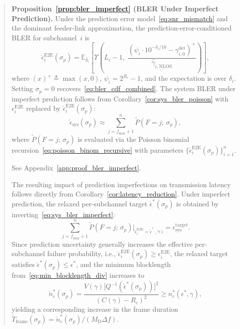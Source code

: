 \begin{quote}
{\noindent\textbf{Proposition~\ref{prop:bler_imperfect} (BLER Under Imperfect Prediction).}
Under the prediction error model~\eqref{eq:snr_mismatch}
and the dominant feeder-link approximation,
the prediction-error-conditioned BLER for subchannel~$i$ is
\begin{equation*}
\check{\epsilon}_i^{\mathrm{E2E}}(\sigma_p)
= \mathbb{E}_{\delta_i}\!\left[
\Upsilon\!\left(L_i - 1,\;
\frac{\left(\psi_i\cdot 10^{-\delta_i/10}
  - \gamma_{i,0}^{\mathrm{det}}\right)^{+}}
{\hat{\gamma}_{i,\mathrm{NLOS}}}\right)\right],
\end{equation*}
where $(x)^{+} \triangleq \max(x,0)$,
$\psi_i = 2^{R_c} - 1$, and the expectation is over
$\delta_i$.
Setting $\sigma_p = 0$
recovers~\eqref{eq:bler_cdf_combined}.
The system BLER under imperfect prediction follows from
Corollary~\ref{cor:sys_bler_poisson} with
$\epsilon_i^{\mathrm{E2E}}$ replaced by
$\check{\epsilon}_i^{\mathrm{E2E}}(\sigma_p)$:
\begin{equation*}
\check{\epsilon}_{\mathrm{sys}}(\sigma_p)
\approx \sum_{j=f_{\max}+1}^{n}
\tilde{P}(F = j;\,\sigma_p),
\end{equation*}
where $\tilde{P}(F = j;\,\sigma_p)$ is evaluated via the
Poisson binomial recursion~\eqref{eq:poisson_binom_recursive}
with parameters
$\{\check{\epsilon}_i^{\mathrm{E2E}}(\sigma_p)\}_{i=1}^{n}$.

\begin{IEEEproof}
{\color{blue}See Appendix~\ref{app:proof_bler_imperfect}.}
\end{IEEEproof}

The resulting impact of prediction imperfections on transmission latency
follows directly from
Corollary~\ref{cor:latency_reduction}.
Under imperfect prediction, the relaxed per-subchannel
target $\check{\epsilon}^{*}(\sigma_p)$ is obtained by
inverting~\eqref{eq:sys_bler_imperfect}:
\begin{equation*}
\sum_{j=f_{\max}+1}^{n}
\tilde{P}(F=j;\,\sigma_p)\big|_{\check{\epsilon}_i^{\mathrm{E2E}}
= \tilde{\epsilon}^{*}\;,\forall\, i}
= \epsilon_{\mathrm{sys}}^{\mathrm{target}}.
\end{equation*}
Since prediction uncertainty generally increases the effective per-subchannel failure probability, i.e.,
$\check{\epsilon}_i^{\mathrm{E2E}}(\sigma_p) \geq
\epsilon_i^{\mathrm{E2E}}$, the relaxed target satisfies
$\check{\epsilon}^{*}(\sigma_p) \leq \epsilon^{*}$,
and the minimum blocklength
from~\eqref{eq:min_blocklength_div} increases to
\begin{equation*}
\check{n}_c^{*}(\sigma_p)
= \frac{V(\gamma)\bigl[Q^{-1}
(\check{\epsilon}^{*}(\sigma_p))\bigr]^2}
{(C(\gamma) - R_c)^2}
\geq n_c^{*}(\epsilon^{*}, \gamma),
\end{equation*}
yielding a corresponding increase in the frame duration
$\check{T}_{\mathrm{frame}}(\sigma_p) =
\check{n}_c^{*}(\sigma_p)/(M_{\mathrm{D}}\Delta f)$.
}%
\end{quote}

